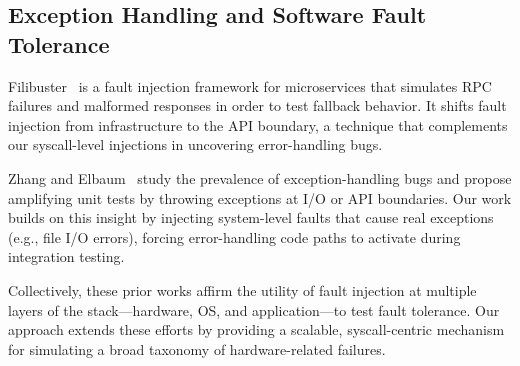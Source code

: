 \subsection{Exception Handling and Software Fault Tolerance}

Filibuster~\cite{filibuster2024} is a fault injection framework for microservices that simulates RPC failures and malformed responses in order to test fallback behavior. It shifts fault injection from infrastructure to the API boundary, a technique that complements our syscall-level injections in uncovering error-handling bugs.

Zhang and Elbaum~\cite{zhangelbaum2012} study the prevalence of exception-handling bugs and propose amplifying unit tests by throwing exceptions at I/O or API boundaries. Our work builds on this insight by injecting system-level faults that cause real exceptions (e.g., file I/O errors), forcing error-handling code paths to activate during integration testing.

\vspace{5pt}
Collectively, these prior works affirm the utility of fault injection at multiple layers of the stack—hardware, OS, and application—to test fault tolerance. Our approach extends these efforts by providing a scalable, syscall-centric mechanism for simulating a broad taxonomy of hardware-related failures.

